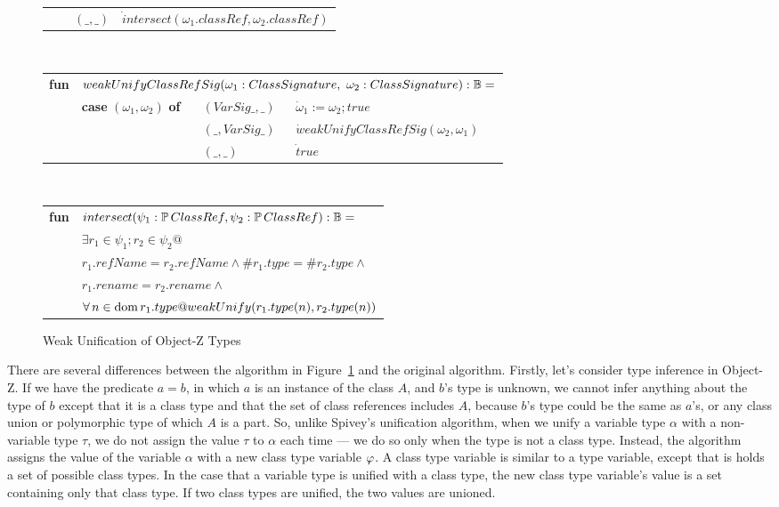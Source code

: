 \begin{figure}[!t]
\begin{tabular}{llll}
      & & $(\_,\_)$ & $\dot intersect(\omega_1.classRef, \omega_2.classRef)$
\end{tabular}
\vspace{2mm}\\
\begin{tabular}{llll}
  {\bf fun} &
  \multicolumn{3}{l}{$weakUnifyClassRefSig(\omega_1:ClassSignature,~\omega_2:ClassSignature) : {\mathbb B} =$}\\
  & {\bf case} $(\omega_1,\omega_2)$ {\bf of} & $(VarSig \_, \_ )$
  & $\dot \omega_1 := \omega_2; true$\\
      & & $(\_, VarSig \_)$ & $\dot weakUnifyClassRefSig(\omega_2,\omega_1)$\\
      & & $(\_, \_)$ & $\dot true$\\
\end{tabular}
\vspace{2mm}\\
\begin{tabular}{ll}
  {\bf fun} & $intersect(\psi_1:\power ClassRef, \psi_2:\power ClassRef) : \bool =$\\
   & \quad\quad$\exists r_1 \in \psi_1; r_2 \in \psi_2 @$\\
   & \quad\quad\quad\quad $r_1.refName = r_2.refName \land \#r_1.type = \#r_2.type \land$\\
   & \quad\quad\quad\quad $r_1.rename = r_2.rename \land$\\
   & \quad\quad\quad\quad $\forall n \in \dom r_1.type @
       weakUnify(r_1.type(n), r_2.type(n))$
\end{tabular}
\caption{Weak Unification of Object-Z Types}
\label{weakUnify}
\end{figure}

There are several differences between the algorithm in
Figure~\ref{weakUnify} and the original algorithm. Firstly, let's
consider type inference in Object-Z. If we have the predicate $a = b$,
in which $a$ is an instance of the class $A$, and $b$'s type is
unknown, we cannot infer anything about the type of $b$ except that it
is a class type and that the set of class references includes $A$,
because $b$'s type could be the same as $a$'s, or any class union or
polymorphic type of which $A$ is a part. So, unlike Spivey's
unification algorithm, when we unify a variable type $\alpha$ with a
non-variable type $\tau$, we do not assign the value $\tau$ to
$\alpha$ each time --- we do so only when the type is not a class
type. Instead, the algorithm assigns the value of the variable
$\alpha$ with a new class type variable $\varphi$. A class type
variable is similar to a type variable, except that is holds a set of
possible class types. In the case that a variable type is unified with
a class type, the new class type variable's value is a set containing
only that class type. If two class types are unified, the two values
are unioned.
  
